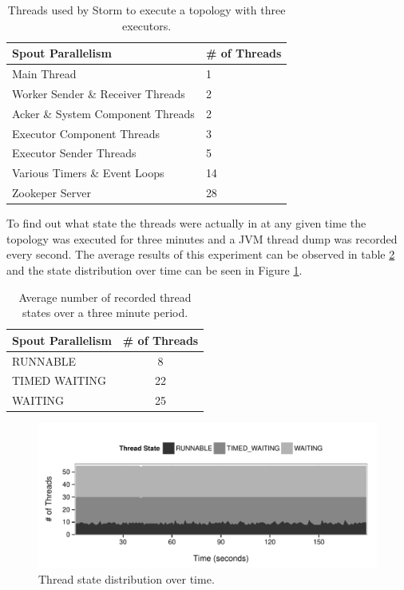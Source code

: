 \documentclass[bsc,logo,frontabs,twoside,singlespacing,normalheadings,parskip]{infthesis}\usepackage[]{graphicx}\usepackage[]{color}
\makeatletter
\def\maxwidth{ %
  \ifdim\Gin@nat@width>\linewidth
    \linewidth
  \else
    \Gin@nat@width
  \fi
}
\newenvironment{knitrout}{}{} %
\makeatother
\begin{document}
\begin{table}[htb!]
\centering
\small
\begin{tabular}{@{}ll@{}}
    \textbf{Spout Parallelism} & \textbf{\# of Threads} \\ \toprule
    Main Thread & 1  \\
	Worker Sender \& Receiver Threads & 2  \\
    Acker \& System Component Threads & 2  \\
    Executor Component Threads & 3  \\
    Executor Sender Threads & 5  \\
    Various Timers \& Event Loops & 14  \\
    Zookeper Server & 28  \\
\end{tabular}
\caption{Threads used by Storm to execute a topology with three executors.}
\label{table:breakdown}
\end{table}

To find out what state the threads were actually in at any given time the topology was executed for three minutes and a JVM thread dump was recorded every second. The average results of this experiment can be observed in table \ref{table:dump} and the state distribution over time can be seen in Figure \ref{fig:dump-plot}.

\begin{table}[htb!]
\centering
\small
\begin{tabular}{@{}lc@{}}
    \textbf{Spout Parallelism} & \textbf{\# of Threads} \\ \toprule
    RUNNABLE & 8  \\
	TIMED WAITING & 22  \\
    WAITING & 25  \\
\end{tabular}
\caption{Average number of recorded thread states over a three minute period.}
\label{table:dump}
\end{table}

\begin{knitrout}
\color{fgcolor}\begin{figure}[!htb]
\includegraphics[width=\maxwidth]{figure/dump-plot-1} \caption[Thread state distribution over time]{Thread state distribution over time.}\label{fig:dump-plot}
\end{figure}


\end{knitrout}
\end{document}
